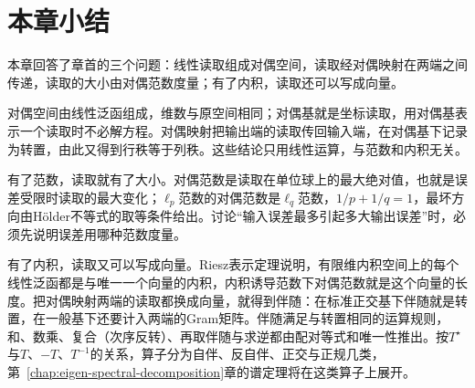 \section{本章小结}
\label{sec:ls-dual-spaces-summary}

本章回答了章首的三个问题：线性读取组成对偶空间，读取经对偶映射在两端之间传递，读取的大小由对偶范数度量；有了内积，读取还可以写成向量。

对偶空间由线性泛函组成，维数与原空间相同；对偶基就是坐标读取，用对偶基表示一个读取时不必解方程。对偶映射把输出端的读取传回输入端，在对偶基下记录为转置，由此又得到行秩等于列秩。这些结论只用线性运算，与范数和内积无关。

有了范数，读取就有了大小。对偶范数是读取在单位球上的最大绝对值，也就是误差受限时读取的最大变化；$\ell_p$范数的对偶范数是$\ell_q$范数，$1/p+1/q=1$，最坏方向由Hölder不等式的取等条件给出。讨论“输入误差最多引起多大输出误差”时，必须先说明误差用哪种范数度量。

有了内积，读取又可以写成向量。Riesz表示定理说明，有限维内积空间上的每个线性泛函都是与唯一一个向量的内积，内积诱导范数下对偶范数就是这个向量的长度。把对偶映射两端的读取都换成向量，就得到伴随：在标准正交基下伴随就是转置，在一般基下还要计入两端的Gram矩阵。伴随满足与转置相同的运算规则，和、数乘、复合（次序反转）、再取伴随与求逆都由配对等式和唯一性推出。按$T^\star$与$T$、$-T$、$T^{-1}$的关系，算子分为自伴、反自伴、正交与正规几类，第~\ref{chap:eigen-spectral-decomposition}章的谱定理将在这类算子上展开。
